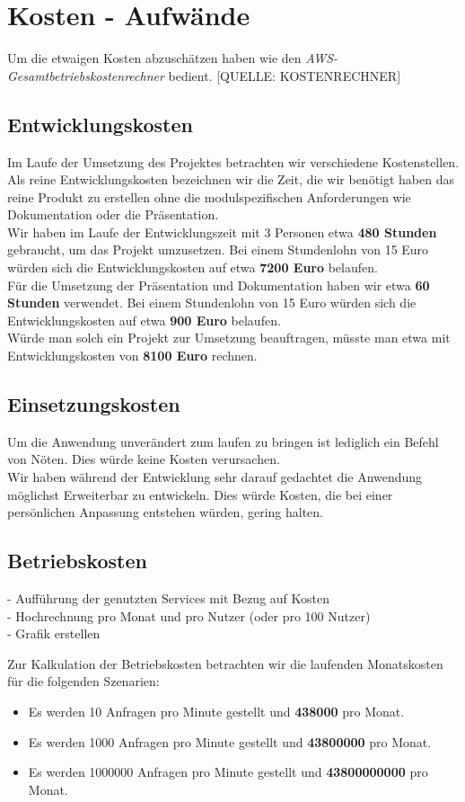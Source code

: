 \documentclass[a4paper, 12pt]{scrreprt}
\renewcommand\_{\textunderscore\allowbreak}
\begin{document}
\chapter{Kosten - Aufwände}
Um die etwaigen Kosten abzuschätzen haben wie den \textit{AWS-Gesamtbetriebskostenrechner} bedient. [QUELLE: KOSTENRECHNER] 
\section{Entwicklungskosten}
Im Laufe der Umsetzung des Projektes betrachten wir verschiedene Kostenstellen. Als reine Entwicklungskosten bezeichnen wir die Zeit, die wir benötigt haben das reine Produkt zu erstellen ohne die modulspezifischen Anforderungen wie Dokumentation oder die Präsentation. \\
Wir haben im Laufe der Entwicklungszeit mit 3 Personen etwa \textbf{480 Stunden} gebraucht, um das Projekt umzusetzen. Bei einem Stundenlohn von 15 Euro würden sich die Entwicklungskosten auf etwa \textbf{7200 Euro} belaufen. \\
Für die Umsetzung der Präsentation und Dokumentation haben wir etwa \textbf{60 Stunden} verwendet. Bei einem Stundenlohn von 15 Euro würden sich die Entwicklungskosten auf etwa \textbf{900 Euro} belaufen. \\
Würde man solch ein Projekt zur Umsetzung beauftragen, müsste man etwa mit Entwicklungskosten von \textbf{8100 Euro} rechnen.
\section{Einsetzungskosten}
Um die Anwendung unverändert zum laufen zu bringen ist lediglich ein Befehl von Nöten. Dies würde keine Kosten verursachen. \\
Wir haben während der Entwicklung sehr darauf gedachtet die Anwendung möglichst Erweiterbar zu entwickeln. Dies würde Kosten, die bei einer persönlichen Anpassung entstehen würden, gering halten.
\section{Betriebskosten}
- Aufführung der genutzten Services mit Bezug auf Kosten\\
- Hochrechnung pro Monat und pro Nutzer (oder pro 100 Nutzer) \\
- Grafik erstellen

Zur Kalkulation der Betriebskosten betrachten wir die laufenden Monatskosten für die folgenden Szenarien:\\
\begin{itemize}
\item Es werden 10 Anfragen pro Minute gestellt und \textbf{438000} pro Monat.
\item Es werden 1000 Anfragen pro Minute gestellt und \textbf{43800000} pro Monat.
\item Es werden 1000000 Anfragen pro Minute gestellt und \textbf{43800000000} pro Monat.
\end{itemize}
\end{document}

